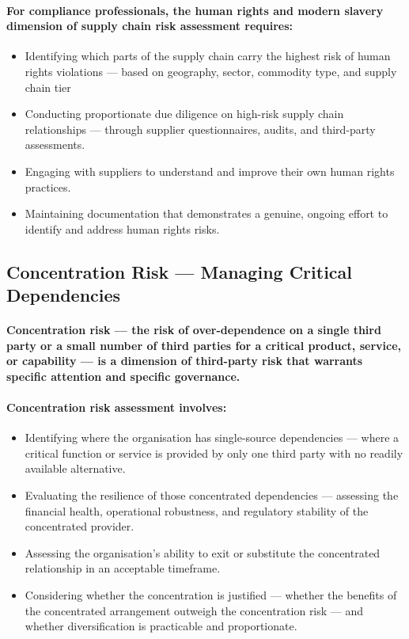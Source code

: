 \paragraph{For compliance professionals, the human rights and modern slavery dimension of supply chain risk assessment requires:}
\begin{itemize}
    \item{Identifying which parts of the supply chain carry the highest risk of human rights violations — based on geography, sector, commodity type, and supply chain tier}
    \item{Conducting proportionate due diligence on high-risk supply chain relationships — through supplier questionnaires, audits, and third-party assessments.}
    \item{Engaging with suppliers to understand and improve their own human rights practices.}
    \item{Maintaining documentation that demonstrates a genuine, ongoing effort to identify and address human rights risks.}
\end{itemize}

\subsection{Concentration Risk — Managing Critical Dependencies}
\paragraph{Concentration risk — the risk of over-dependence on a single third party or a small number of third parties for a critical product, service, or capability — is a dimension of third-party risk that warrants specific attention and specific governance.}
\paragraph{Concentration risk assessment involves:}
\begin{itemize}
    \item{Identifying where the organisation has single-source dependencies — where a critical function or service is provided by only one third party with no readily available alternative.}
    \item{Evaluating the resilience of those concentrated dependencies — assessing the financial health, operational robustness, and regulatory stability of the concentrated provider.}
    \item{Assessing the organisation's ability to exit or substitute the concentrated relationship in an acceptable timeframe.}
    \item{Considering whether the concentration is justified — whether the benefits of the concentrated arrangement outweigh the concentration risk — and whether diversification is practicable and proportionate.}
\end{itemize}
